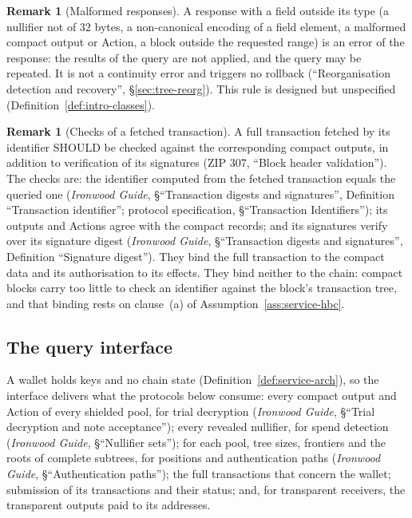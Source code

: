 \documentclass[11pt,a4paper]{article}
\theoremstyle{definition}
\newtheorem{remark}[theorem]{Remark}
\begin{document}
\begin{remark}[Malformed responses]
A response with a field outside its type (a nullifier not of $32$ bytes, a
non-canonical encoding of a field element, a malformed compact output or
Action, a block outside the requested range) is an error of the response:
the results of the query are not applied, and the query may be repeated. It
is not a continuity error and triggers no rollback (``Reorganisation
detection and recovery'', \S\ref{sec:tree-reorg}). This rule is designed but
unspecified (Definition~\ref{def:intro-classes}).
\end{remark}

\begin{remark}[Checks of a fetched transaction]
A full transaction fetched by its identifier SHOULD be checked against the
corresponding compact outputs, in addition to verification of its
signatures (ZIP 307, ``Block header validation''). The checks are: the
identifier computed from the fetched transaction equals the queried one
(\emph{Ironwood Guide}, \S``Transaction digests and signatures'', Definition
``Transaction identifier''; protocol specification, \S``Transaction
Identifiers''); its outputs and Actions agree with the compact records; and its
signatures verify over its signature digest (\emph{Ironwood Guide},
\S``Transaction digests and signatures'', Definition ``Signature digest''). They
bind the full transaction to the compact data and its authorisation to its
effects. They bind neither to the chain: compact blocks carry too little to
check an identifier against the block's transaction tree, and that binding rests
on clause~(a) of Assumption~\ref{ass:service-hbc}.
\end{remark}

\subsection{The query interface}\label{sec:service-queries}

A wallet holds keys and no chain state (Definition~\ref{def:service-arch}),
so the interface delivers what the protocols below consume: every compact
output and Action of every shielded pool, for trial decryption
(\emph{Ironwood Guide}, \S``Trial decryption and note acceptance''); every
revealed nullifier, for spend detection (\emph{Ironwood Guide},
\S``Nullifier sets''); for each pool, tree sizes, frontiers and the roots of
complete subtrees, for positions and authentication paths (\emph{Ironwood
Guide}, \S``Authentication paths''); the full transactions that concern the
wallet; submission of its transactions and their status; and, for
transparent receivers, the transparent outputs paid to its addresses.
\end{document}
